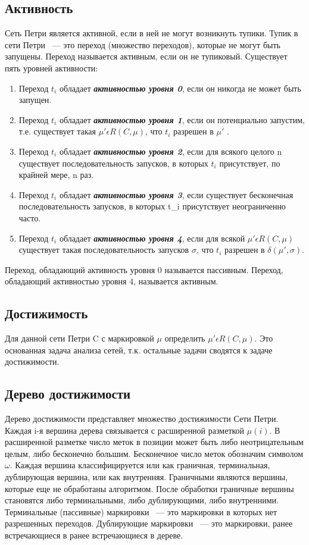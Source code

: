 \subsection*{Активность}
Сеть Петри является активной, если в ней не могут возникнуть тупики. Тупик в сети Петри ~--- это переход (множество переходов), которые не могут быть запущены. Переход называется активным, если он не тупиковый. Существует пять уровней активности:
\begin{enumerate}
\item Переход $ t_{i} $ обладает \textbf{\textit{активностью уровня 0}}, если он никогда не может быть запущен.
\item Переход $ t_{i} $ обладает \textbf{\textit{активностью уровня 1}}, если он потенциально запустим, т.е. существует такая $ \mu' \epsilon R(C, \mu) $, что $ t_{i} $ разрешен в $ \mu' $ .
\item Переход $ t_{i} $ обладает \textbf{\textit{активностью уровня 2}}, если для всякого целого n существует последовательность запусков, в которых $ t_{i} $ присутствует, по крайней мере, n раз.
\item Переход $ t_{i} $ обладает \textbf{\textit{активностью уровня 3}}, если существует бесконечная последовательность запусков, в которых t_{i} присутствует неограниченно часто.
\item Переход $ t_{i} $ обладает \textbf{\textit{активностью уровня 4}}, если для всякой $ \mu' \epsilon R(C, \mu) $ существует такая последовательность запусков $\sigma $, что $ t_{i} $ разрешен в $ \delta(\mu', \sigma) $.
\end{enumerate}

Переход, обладающий активность уровня 0 называется пассивным. Переход, обладающий активностью уровня 4, называется активным.

\subsection*{Достижимость}
Для данной сети Петри C с маркировкой $ \mu $ определить $ \mu' \epsilon R(C, \mu) $. Это основанная задача анализа сетей, т.к. остальные задачи сводятся к задаче достижимости.

\subsection{Дерево достижимости}

Дерево достижимости представляет множество достижимости Сети Петри. Каждая i-я вершина дерева связывается с расширенной разметкой $ \mu(i) $. В расширенной разметке число меток в позиции может быть либо неотрицательным целым, либо бесконечно большим. Бесконечное число меток обозначим символом $ \omega $. Каждая вершина классифицируется или как граничная, терминальная, дублирующая вершина, или как внутренняя. Граничными являются вершины, которые еще не обработаны алгоритмом. После обработки граничные вершины становятся либо терминальными, либо дублирующими, либо внутренними. Терминальные (пассивные) маркировки ~--- это маркировки в которых нет разрешенных переходов. Дублирующие маркировки ~--- это маркировки, ранее встречающиеся в ранее встречающиеся в дереве.

